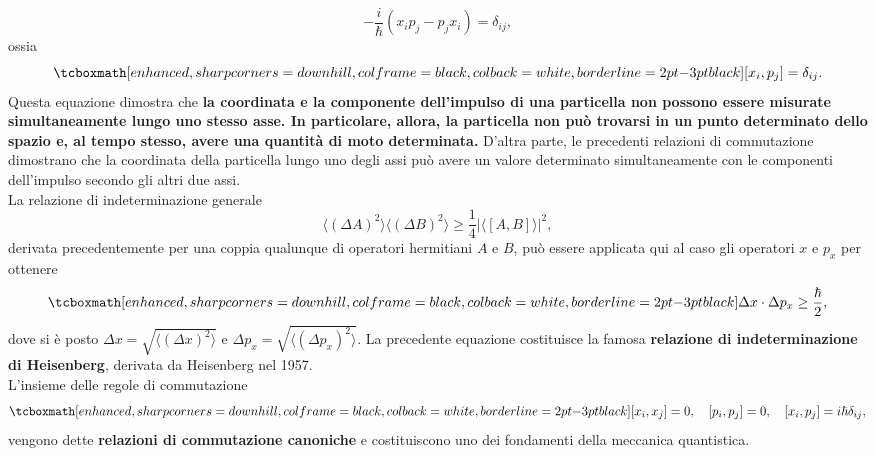 	\begin{equation}
		-\frac{i}{\hbar}\left( x_ip_j-p_jx_i\right) =\delta _{ij},
	\end{equation}
ossia
	\begin{equation}
		\tcboxmath[enhanced, sharp corners=downhill, colframe=black, colback=white, borderline={2pt}{-3pt}{black}]{
			\left[ x_i, p_j \right] =\delta _{ij}.
			}
	\end{equation}
Questa equazione dimostra che \textbf{la coordinata e la componente dell'impulso di una particella non possono essere misurate simultaneamente lungo uno stesso asse. In particolare, allora, la particella non può trovarsi in un punto determinato dello spazio e, al tempo stesso, avere una quantità di moto determinata.} D'altra parte, le precedenti relazioni di commutazione dimostrano che la coordinata della particella lungo uno degli assi può avere un valore determinato simultaneamente con le componenti dell'impulso secondo gli altri due assi.\\

La relazione di indeterminazione generale
	\begin{equation}
		\langle \left( \Delta A\right)^2\rangle \langle \left( \Delta B\right)^2\rangle \geq \frac{1}{4}\vert \langle \left[A,B\right] \rangle \vert ^2 ,
	\end{equation}
derivata precedentemente per una coppia qualunque di operatori hermitiani $A$ e $B$, può essere applicata qui al caso gli operatori $x$ e $p_x$ per ottenere
	\begin{equation}
		\tcboxmath[enhanced, sharp corners=downhill, colframe=black, colback=white, borderline={2pt}{-3pt}{black}]{
			\Delta x \cdot \Delta p_x \geq \frac{\hbar}{2} ,
			}
	\end{equation}
dove si è posto $\Delta x = \sqrt{\langle\left(\Delta x\right) ^2\rangle}$ e $\Delta p_x = \sqrt{\langle\left(\Delta p_x\right) ^2\rangle}$. La precedente equazione costituisce la famosa \textbf{relazione di indeterminazione di Heisenberg}, derivata da Heisenberg nel 1957.\\

L'insieme delle regole di commutazione
	\begin{equation}
		\tcboxmath[enhanced, sharp corners=downhill, colframe=black, colback=white, borderline={2pt}{-3pt}{black}]{
			\left[ x_i, x_j\right]=0, \quad \left[ p_i, p_j\right]=0, \quad \left[ x_i, p_j\right]=i\hbar \delta _{ij},
			} 
	\end{equation}
vengono dette \textbf{relazioni di commutazione canoniche} e costituiscono uno dei fondamenti della meccanica quantistica.\\

